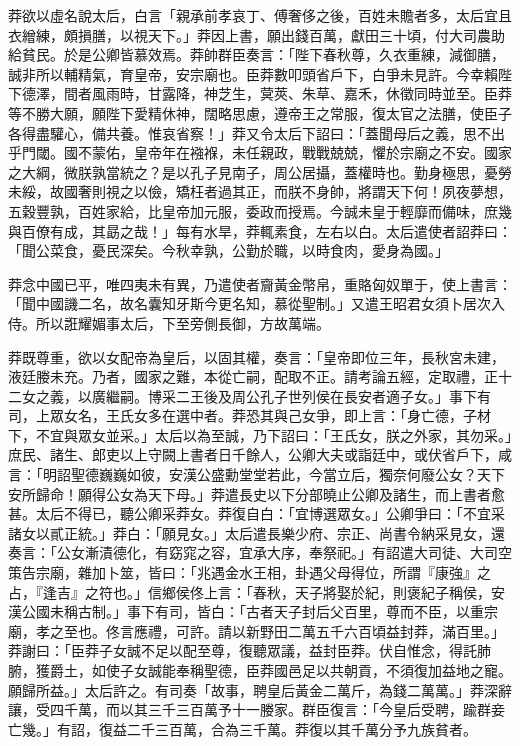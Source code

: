 \begin{pinyinscope}
莽欲以虛名說太后，白言「親承前孝哀丁、傅奢侈之後，百姓未贍者多，太后宜且衣繒練，頗損膳，以視天下。」莽因上書，願出錢百萬，獻田三十頃，付大司農助給貧民。於是公卿皆慕效焉。莽帥群臣奏言：「陛下春秋尊，久衣重練，減御膳，誠非所以輔精氣，育皇帝，安宗廟也。臣莽數叩頭省戶下，白爭未見許。今幸賴陛下德澤，間者風雨時，甘露降，神芝生，蓂莢、朱草、嘉禾，休徵同時並至。臣莽等不勝大願，願陛下愛精休神，闊略思慮，遵帝王之常服，復太官之法膳，使臣子各得盡驩心，備共養。惟哀省察！」莽又令太后下詔曰：「蓋聞母后之義，思不出乎門閾。國不蒙佑，皇帝年在襁褓，未任親政，戰戰兢兢，懼於宗廟之不安。國家之大綱，微朕孰當統之？是以孔子見南子，周公居攝，蓋權時也。勤身極思，憂勞未綏，故國奢則視之以儉，矯枉者過其正，而朕不身帥，將謂天下何！夙夜夢想，五穀豐孰，百姓家給，比皇帝加元服，委政而授焉。今誠未皇于輕靡而備味，庶幾與百僚有成，其勗之哉！」每有水旱，莽輒素食，左右以白。太后遣使者詔莽曰：「聞公菜食，憂民深矣。今秋幸孰，公勤於職，以時食肉，愛身為國。」

莽念中國已平，唯四夷未有異，乃遣使者齎黃金幣帛，重賂匈奴單于，使上書言：「聞中國譏二名，故名囊知牙斯今更名知，慕從聖制。」又遣王昭君女須卜居次入侍。所以誑耀媚事太后，下至旁側長御，方故萬端。

莽既尊重，欲以女配帝為皇后，以固其權，奏言：「皇帝即位三年，長秋宮未建，液廷媵未充。乃者，國家之難，本從亡嗣，配取不正。請考論五經，定取禮，正十二女之義，以廣繼嗣。博采二王後及周公孔子世列侯在長安者適子女。」事下有司，上眾女名，王氏女多在選中者。莽恐其與己女爭，即上言：「身亡德，子材下，不宜與眾女並采。」太后以為至誠，乃下詔曰：「王氏女，朕之外家，其勿采。」庶民、諸生、郎吏以上守闕上書者日千餘人，公卿大夫或詣廷中，或伏省戶下，咸言：「明詔聖德巍巍如彼，安漢公盛勳堂堂若此，今當立后，獨奈何廢公女？天下安所歸命！願得公女為天下母。」莽遣長史以下分部曉止公卿及諸生，而上書者愈甚。太后不得已，聽公卿采莽女。莽復自白：「宜博選眾女。」公卿爭曰：「不宜采諸女以貳正統。」莽白：「願見女。」太后遣長樂少府、宗正、尚書令納采見女，還奏言：「公女漸漬德化，有窈窕之容，宜承大序，奉祭祀。」有詔遣大司徒、大司空策告宗廟，雜加卜筮，皆曰：「兆遇金水王相，卦遇父母得位，所謂『康強』之占，『逢吉』之符也。」信鄉侯佟上言：「春秋，天子將娶於紀，則褒紀子稱侯，安漢公國未稱古制。」事下有司，皆白：「古者天子封后父百里，尊而不臣，以重宗廟，孝之至也。佟言應禮，可許。請以新野田二萬五千六百頃益封莽，滿百里。」莽謝曰：「臣莽子女誠不足以配至尊，復聽眾議，益封臣莽。伏自惟念，得託肺腑，獲爵土，如使子女誠能奉稱聖德，臣莽國邑足以共朝貢，不須復加益地之寵。願歸所益。」太后許之。有司奏「故事，聘皇后黃金二萬斤，為錢二萬萬。」莽深辭讓，受四千萬，而以其三千三百萬予十一媵家。群臣復言：「今皇后受聘，踰群妾亡幾。」有詔，復益二千三百萬，合為三千萬。莽復以其千萬分予九族貧者。


\end{pinyinscope}
